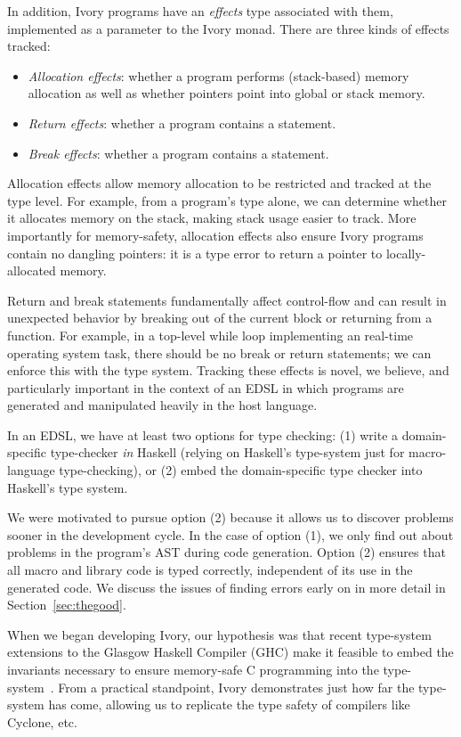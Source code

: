 In addition, Ivory programs have an \emph{effects} type associated with them,
implemented as a parameter to the Ivory monad.  There are three kinds of effects
tracked:
\begin{itemize}
  \item \emph{Allocation effects}: whether a program performs (stack-based)
    memory allocation as well as whether pointers point into global or stack memory.
  \item \emph{Return effects}: whether a program contains a  statement.
  \item \emph{Break effects}: whether a program contains a 
    statement.
\end{itemize}
\noindent
Allocation effects allow memory allocation to be restricted and tracked at the
type level.  For example, from a program's type alone, we can determine whether
it allocates memory on the stack, making stack usage easier to track.  More
importantly for memory-safety, allocation effects also ensure Ivory programs
contain no dangling pointers: it is a type error to return a pointer to
locally-allocated memory.

Return and break statements fundamentally affect control-flow and can result in
unexpected behavior by breaking out of the current block or returning from a
function.  For example, in a top-level while loop implementing an real-time
operating system task, there should be no break or return statements; we can
enforce this with the type system.  Tracking these effects is novel, we believe,
and particularly important in the context of an EDSL in which programs are
generated and manipulated heavily in the host language.

In an EDSL, we have at least two options for type checking: (1) write a
domain-specific type-checker \emph{in} Haskell (relying on Haskell's type-system
just for macro-language type-checking), or (2) embed the domain-specific type
checker into Haskell's type system.

We were motivated to pursue option (2) because it allows us to discover problems
sooner in the development cycle. In the case of option (1), we only find out
about problems in the program's AST during code generation. Option (2) ensures
that all macro and library code is typed correctly, independent of its use in
the generated code. We discuss the issues of finding errors early on in more
detail in Section~\ref{sec:thegood}.

When we began developing Ivory, our hypothesis  was that recent type-system
extensions to the Glasgow Haskell Compiler (GHC) make it feasible to embed the
invariants necessary to ensure memory-safe C programming into the
type-system~\cite{dephaskell}. From a practical standpoint, Ivory demonstrates
just how far the type-system has come, allowing us to replicate the type safety
of compilers like Cyclone, etc.

